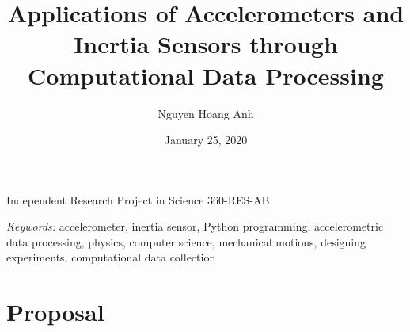 \documentclass[11pt, twoside, a4paper]{article}
\author{Nguyen Hoang Anh}
\affil{John Abbott College\\ \email{hoanganh.theodore@icloud.com}}
\date{January 25, 2020}
\title{Applications of Accelerometers and Inertia Sensors through Computational Data Processing}
\begin{document}
    \maketitle

    \begin{center}
        Independent Research Project in Science 360-RES-AB       
    \end{center}
    \textit{Keywords:} accelerometer, inertia sensor, Python programming, accelerometric data processing, physics, computer science, mechanical motions, designing experiments, computational data collection

    \section*{Proposal}
    
\end{document}
